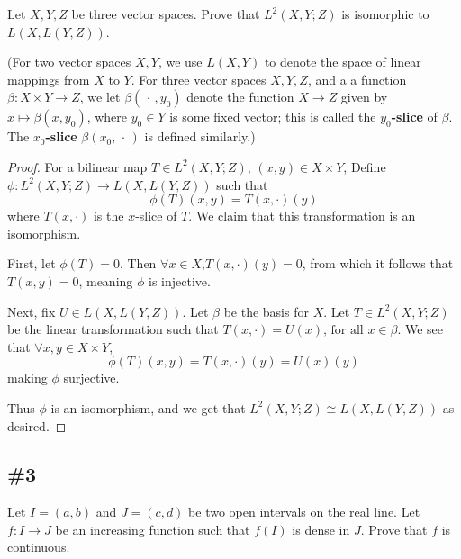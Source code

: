 \documentclass{article}
\theoremstyle{plain} %
\numberwithin{thm}{section} %
\theoremstyle{definition}
\begin{document}
    \bigskip

    Let $X,Y,Z$ be three vector spaces. Prove that $L^2(X,Y;Z)$ is isomorphic to $L(X,L(Y,Z))$.

   (For two vector spaces $X,Y$, we use $L(X,Y)$ to denote the space of linear mappings from $X$ to $Y$. For three vector spaces $X,Y,Z$, and a a function $\beta:X\times Y\rightarrow Z$, we let $\beta(\,\cdot\,,y_0)$ denote the function $X\rightarrow Z$ given by $x\mapsto \beta(x,y_0)$, where $y_0\in Y$ is some fixed vector; this is called the \textbf{$y_0$-slice} of $\beta$. The \textbf{$x_0$-slice} $\beta(x_0, \,\cdot\,)$ is defined similarly.)

   \begin{proof}
        For a bilinear map \(T \in L^2(X,Y;Z)\), \((x,y) \in X \times Y\), Define \(\phi : L^2(X,Y;Z) \to L(X,L(Y,Z))\) such that
        \[
            \phi (T)(x,y) = T(x, \cdot)(y)
        \]  
        where \(T(x,\cdot)\) is the \(x\)-slice of \(T\). We claim that this transformation is an isomorphism.

        First, let \(\phi (T) = 0\). Then \(\forall x \in X \text{,} T(x, \cdot)(y) = 0\), from which it follows that \(T(x, y) = 0\), meaning \(\phi\) is injective. 
        
        Next, fix \(U \in L(X,L(Y,Z))\). Let \(\beta \) be the basis for \(X\). Let \(T \in L^2(X,Y;Z)\) be the linear transformation such that \(T(x, \cdot) = U(x) \text{, for all } x \in \beta \). We see that \(\forall x,y \in X \times Y\),
        \[
            \phi (T)(x,y) = T(x, \cdot)(y) = U(x)(y)
        \]
        making \(\phi \) surjective.

        Thus \(\phi \) is an isomorphism, and we get that \(L^2(X,Y;Z) \cong L(X,L(Y,Z))\) as desired.
   \end{proof}

   \subsection{\#3}

   Let $I=(a,b)$ and $J=(c,d)$ be two open intervals on the real line. Let $f:I\rightarrow J$ be an increasing function such that $f(I)$ is dense in $J$. Prove that $f$ is continuous.
\end{document}
